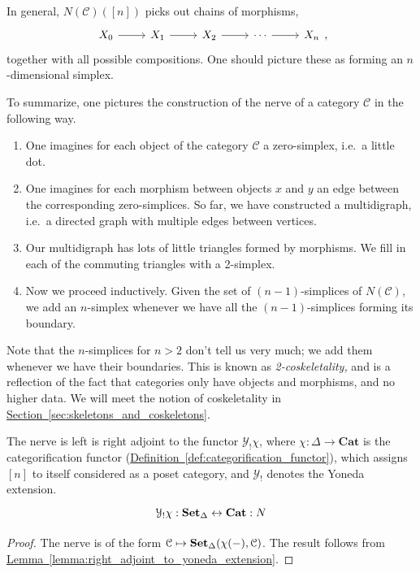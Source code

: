 \documentclass[main.tex]{subfiles}
\begin{document}
In general, $N(\mathcal{C})([n])$ picks out chains of morphisms,
\begin{equation*}
  \begin{tikzcd}
    X_{0}
    \arrow[r]
    & X_{1}
    \arrow[r]
    & X_{2}
    \arrow[r]
    & \cdots
    \arrow[r]
    & X_{n}
  \end{tikzcd},
\end{equation*}
together with all possible compositions. One should picture these as forming an $n$-dimensional simplex.

To summarize, one pictures the construction of the nerve of a category $\mathcal{C}$ in the following way.
\begin{enumerate}
  \item One imagines for each object of the category $\mathcal{C}$ a zero-simplex, i.e.\ a little dot.

  \item One imagines for each morphism between objects $x$ and $y$ an edge between the corresponding zero-simplices. So far, we have constructed a multidigraph, i.e.\ a directed graph with multiple edges between vertices.

  \item Our multidigraph has lots of little triangles formed by morphisms. We fill in each of the commuting triangles with a 2-simplex.

  \item Now we proceed inductively. Given the set of $(n-1)$-simplices of $N(\mathcal{C})$, we add an $n$-simplex whenever we have all the $(n-1)$-simplices forming its boundary.
\end{enumerate}
Note that the $n$-simplices for $n > 2$ don't tell us very much; we add them whenever we have their boundaries. This is known as \emph{2-coskeletality,} and is a reflection of the fact that categories only have objects and morphisms, and no higher data. We will meet the notion of coskeletality in \hyperref[sec:skeletons_and_coskeletons]{Section~\ref*{sec:skeletons_and_coskeletons}}.

\begin{proposition}
  \label{prop:nerve_left_adjoint_to_yoneda_extension}
  The nerve is left is right adjoint to the functor $\mathcal{Y}_{!}\chi$, where $\chi\colon \Delta \to \mathbf{Cat}$ is the categorification functor (\hyperref[def:categorification_functor]{Definition~\ref*{def:categorification_functor}}), which assigns $[n]$ to itself considered as a poset category, and $\mathcal{Y}_{!}$ denotes the Yoneda extension.
  \begin{equation*}
    \begin{tikzcd}
      \mathcal{Y}_{!}\chi : \SSet \leftrightarrow \mathbf{Cat} : N
    \end{tikzcd}
  \end{equation*}
\end{proposition}
\begin{proof}
  The nerve is of the form $\mathcal{C} \mapsto \operatorname{\mathbf{Set}_{\Delta}}(\chi(-), \mathcal{C})$. The result follows from \hyperref[lemma:right_adjoint_to_yoneda_extension]{Lemma~\ref*{lemma:right_adjoint_to_yoneda_extension}}.
\end{proof}
\end{document}
